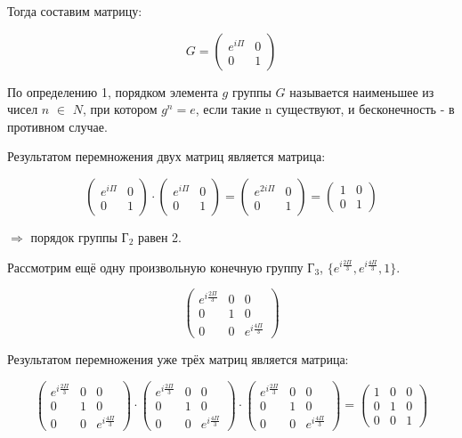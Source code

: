 \documentclass[utf8,14pt,a4paper,oneside,russian]{book}
\begin{document}
	Тогда составим матрицу:
	
	\[ G = \left( 
	\begin{array}{cccc}
	e^{i\Pi}&0\\
	0&1
	\end{array} 
	\right) \]
	
	По определению 1, порядком элемента $g$ группы $G$ называется наименьшее из чисел $n$ $\in$ $N$, при котором $g^{n}=e$, если такие n существуют, и бесконечность - в противном случае.
	
	Результатом перемножения двух матриц является матрица:
	
	$$
	\begin{pmatrix} 
	e^{i\Pi} & 0 \\
	0 & 1
	\end{pmatrix}   \cdot
	\begin{pmatrix}
	e^{i\Pi} & 0 \\
	0 & 1
	\end{pmatrix} =
	\begin{pmatrix}
	e^{2i\Pi} & 0 \\
	0 & 1
	\end{pmatrix} =
	\begin{pmatrix}
	1 & 0 \\
	0 & 1
	\end{pmatrix}
	$$
	
	$\Rightarrow$ порядок группы Г$_{2}$ равен 2.
	
	Рассмотрим ещё одну произвольную конечную группу Г$_{3}$, $\{e^{i\frac{2\Pi}{3}},e^{i\frac{4\Pi}{3}},1\}$.
	
	$$
	\begin{pmatrix} 
	e^{i\frac{2\Pi}{3}} & 0 & 0 \\
	0 & 1 & 0 \\
	0 & 0 & e^{i\frac{4\Pi}{3}}		
	\end{pmatrix}
	$$
	
	Результатом перемножения уже трёх матриц является матрица:
	
	$$
	\begin{pmatrix} 
	e^{i\frac{2\Pi}{3}} & 0 & 0 \\
	0 & 1 & 0 \\
	0 & 0 & e^{i\frac{4\Pi}{3}}		
	\end{pmatrix} \cdot
	\begin{pmatrix} 
	e^{i\frac{2\Pi}{3}} & 0 & 0 \\
	0 & 1 & 0 \\
	0 & 0 & e^{i\frac{4\Pi}{3}}		
	\end{pmatrix} \cdot
		\begin{pmatrix} 
	e^{i\frac{2\Pi}{3}} & 0 & 0 \\
	0 & 1 & 0 \\
	0 & 0 & e^{i\frac{4\Pi}{3}}		
	\end{pmatrix} = 
		\begin{pmatrix} 
	1 & 0 & 0 \\
	0 & 1 & 0 \\
	0 & 0 & 1		
	\end{pmatrix}
	$$
	
\end{document}
